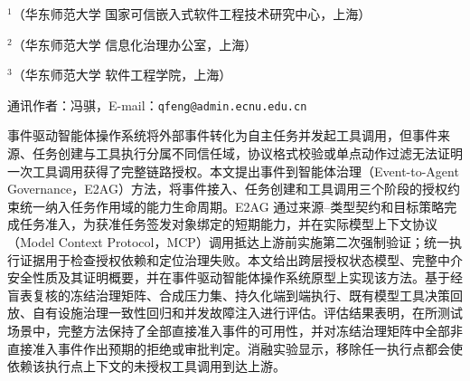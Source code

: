 \thispagestyle{josfirst}


\vspace{7pt}

\vspace{4pt}
\begingroup\fontsize{8pt}{12pt}\selectfont
\noindent$^{1}$（华东师范大学 国家可信嵌入式软件工程技术研究中心，上海）\par
\noindent$^{2}$（华东师范大学 信息化治理办公室，上海）\par
\noindent$^{3}$（华东师范大学 软件工程学院，上海）\par
\noindent 通讯作者：冯骐，E-mail：\texttt{qfeng@admin.ecnu.edu.cn}\par
\endgroup

\begin{joszhabstract}
事件驱动智能体操作系统将外部事件转化为自主任务并发起工具调用，但事件来源、任务创建与工具执行分属不同信任域，协议格式校验或单点动作过滤无法证明一次工具调用获得了完整链路授权。本文提出事件到智能体治理（Event-to-Agent Governance，E2AG）方法，将事件接入、任务创建和工具调用三个阶段的授权约束统一纳入任务作用域的能力生命周期。E2AG 通过来源--类型契约和目标策略完成任务准入，为获准任务签发对象绑定的短期能力，并在实际模型上下文协议（Model Context Protocol，MCP）调用抵达上游前实施第二次强制验证；统一执行证据用于检查授权依赖和定位治理失败。本文给出跨层授权状态模型、完整中介安全性质及其证明概要，并在事件驱动智能体操作系统原型上实现该方法。基于经盲表复核的冻结治理矩阵、合成压力集、持久化端到端执行、既有模型工具决策回放、自有设施治理一致性回归和并发故障注入进行评估。评估结果表明，在所测试场景中，完整方法保持了全部直接准入事件的可用性，并对冻结治理矩阵中全部非直接准入事件作出预期的拒绝或审批判定。消融实验显示，移除任一执行点都会使依赖该执行点上下文的未授权工具调用到达上游。
\end{joszhabstract}

